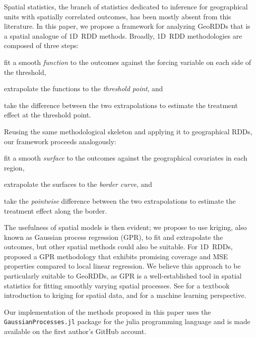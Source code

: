 Spatial statistics, the branch of statistics dedicated to inference for geographical units with spatially correlated outcomes, has been mostly absent from this literature.
In this paper, we propose a framework for analyzing GeoRDDs that is a spatial analogue of 1D~RDD methods.
Broadly, 1D~RDD methodologies \citep{imbensrdd} are composed of three steps:
\begin{flatlist}
    \item
        fit a smooth \emph{function} to the outcomes against the forcing variable on each side of the threshold,
    \item
        extrapolate the functions to the \emph{threshold point}, and
    \item
        take the difference between the two extrapolations to estimate the treatment effect at the threshold point.
\end{flatlist}
Reusing the same methodological skeleton and applying it to geographical RDDs, our framework proceeds analogously:
\begin{flatlist}
    \item
        fit a smooth \emph{surface} to the outcomes against the geographical covariates in each region,
    \item
        extrapolate the surfaces to the \emph{border curve}, and
    \item
        take the \emph{pointwise} difference between the two extrapolations to estimate the treatment effect along the border.
\end{flatlist}
\label{sec:framework}
The usefulness of spatial models is then evident;
we propose to use kriging, also known as Gaussian process regression (GPR), to fit and extrapolate the outcomes, 
but other spatial methods could also be suitable.
For 1D~RDDs, \citet{Branson:2017qy} proposed a GPR methodology that exhibits promising coverage and MSE properties compared to local linear regression.
We believe this approach to be particularly suitable to GeoRDDs, as GPR is a well-established tool in spatial statistics for fitting smoothly varying spatial processes.
See \citet{banerjee2014hierarchical} for a textbook introduction to kriging for spatial data, and \citet{rasmussen2006gaussian} for a machine learning perspective.

Our implementation of the methods proposed in this paper uses the \texttt{GaussianProcesses.jl} package \citep{fairbrother2018gaussianprocesses} for the julia programming language \citep{bezanson2017julia} and is made available on the first author's GitHub account.

